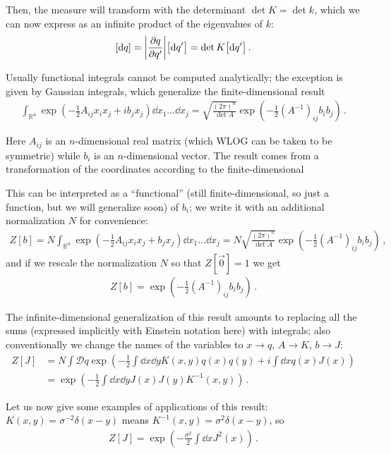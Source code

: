 \documentclass[main.tex]{subfiles}
\begin{document}
Then, the measure will transform with the determinant \(\det K = \det k\), which we can now express as an infinite product of the eigenvalues of \(k\): 
%
\begin{align}
\qty[ \dd{q}] = \abs{\pdv{q}{q'}} \qty[ \dd{q'}] = \det K \qty[ \dd{q'}]
\,.
\end{align}

Usually functional integrals cannot be computed analytically; the exception is given by Gaussian integrals, which generalize the finite-dimensional result 
%
\begin{align}
\int_{\mathbb{R}^{n}} \exp(- \frac{1}{2} A_{ij} x_i x_j + i b_j x_j) \dd{x_1 } \dots \dd{x_j} = \sqrt{\frac{(2 \pi)^{n}}{\det A}}
\exp(- \frac{1}{2} (A^{-1})_{ij} b_i b_j)
\,.
\end{align}

Here \(A_{ij}\) is an \(n\)-dimensional real matrix (which WLOG can be taken to be symmetric) while \(b_i\) is an \(n\)-dimensional vector.
The result comes from a transformation of the coordinates according to the finite-dimensional 

This can be interpreted as a ``functional'' (still finite-dimensional, so just a function, but we will generalize soon) of \(b_i\); we write it with an additional normalization \(N\) for convenience:
%
\begin{align}
Z[b] = N \int _{\mathbb{R}^{n}} \exp(- \frac{1}{2} A_{ij} x_i x_j + b_j x_j) \dd{x_1 } \dots \dd{x_j}
= N \sqrt{\frac{(2 \pi )^{n}}{\det A}} \exp(- \frac{1}{2} (A^{-1})_{ij}b_i b_j)
\,,
\end{align}
%
and if we rescale the normalization \(N\) so that \(Z[\vec{0}] = 1 \) we get 
%
\begin{align}
Z[b] = \exp(- \frac{1}{2} (A^{-1})_{ij}b_i b_j)
\,.
\end{align}

The infinite-dimensional generalization of this result amounts to replacing all the sums (expressed implicitly with Einstein notation here) with integrals; also conventionally we change the names of the variables to \(x \to q\), \(A \to K\), \(b \to J\): 
%
\begin{align}
Z[J] &= N \int \mathcal{D}q \exp(- \frac{1}{2} \int \dd{x} \dd{y} K(x, y) q(x) q(y) + i \int \dd{x} q(x) J(x))  \\
&= \exp(- \frac{1}{2} \int \dd{x} \dd{y} J(x) J(y) K^{-1}(x, y))
\,.
\end{align}

Let us now give some examples of applications of this result: \(K(x,y) = \sigma^{-2} \delta (x-y)\) means \(K^{-1}(x,y) = \sigma^2 \delta (x-y) \), so 
%
\begin{align}
Z[J] = \exp(- \frac{\sigma^2}{2} \int \dd{x} J^2(x))
\,.
\end{align}
\end{document}
